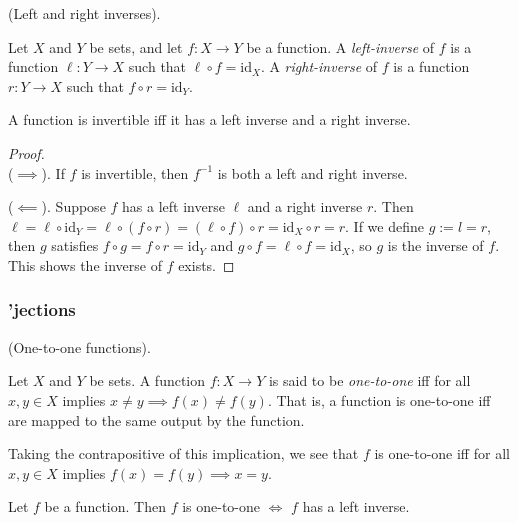 \begin{defn}
    (Left and right inverses).

    Let $X$ and $Y$ be sets, and let $f:X \rightarrow Y$ be a function. A \textit{left-inverse} of $f$ is a function $\ell:Y \rightarrow X$ such that $\ell \circ f = \text{id}_X$. A \textit{right-inverse} of $f$ is a function $r:Y \rightarrow X$ such that $f \circ r = \text{id}_Y$.
\end{defn}

\begin{theorem}
    A function is invertible iff it has a left inverse and a right inverse.
\end{theorem}

\begin{proof}
    \mbox{} \\

    ($\implies$). If $f$ is invertible, then $f^{-1}$ is both a left and right inverse.

    ($\impliedby$). Suppose $f$ has a left inverse $\ell$ and a right inverse $r$. Then $\ell = \ell \circ \text{id}_Y = \ell \circ (f \circ r) = (\ell \circ f) \circ r = \text{id}_X \circ r = r$. If we define $g := l = r$, then $g$ satisfies $f \circ g = f \circ r = \text{id}_Y$ and $g \circ f = \ell \circ f = \text{id}_X$, so $g$ is the inverse of $f$. This shows the inverse of $f$ exists.
\end{proof}

\subsubsection*{'jections}

\begin{defn}
    (One-to-one functions).

    Let $X$ and $Y$ be sets. A function $f:X \rightarrow Y$ is said to be \textit{one-to-one} iff for all $x, y \in X$ implies $x \neq y \implies f(x) \neq f(y)$. That is, a function is one-to-one iff are mapped to the same output by the function.

    Taking the contrapositive of this implication, we see that $f$ is one-to-one iff for all $x, y \in X$ implies $f(x) = f(y) \implies x = y$.
\end{defn}

\begin{theorem}
    Let $f$ be a function. Then $f$ is one-to-one $\iff$ $f$ has a left inverse.
\end{theorem}

